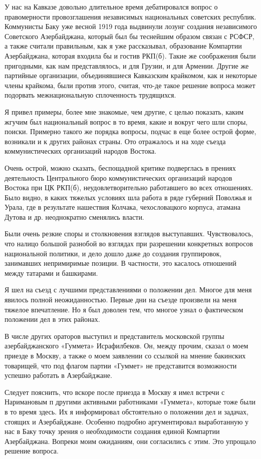 \documentclass[12pt, a4paper, openany]{book}
\begin{document}
У нас на Кавказе довольно длительное время дебатировался вопрос о правомерности провозглашения независимых национальных советских республик. Коммунисты Баку уже весной 1919 года выдвинули лозунг создания независимого Советского Азербайджана, который был бы теснейшим образом связан с РСФСР, а также считали правильным, как я уже рассказывал, образование Компартии Азербайджана, которая входила бы и гостив РКП(б). Такие же соображения были пригодными, как нам представлялось, и для Грузии, и для Армении. Другие же партийные организации, объединявшиеся Кавказским крайкомом, как и некоторые члены крайкома, были против этого, считая, что-де такое решение вопроса может подорвать межнациональную сплоченность трудящихся.

Я привел примеры, более мне знакомые, чем другие, с целью показать, каким жгучим был национальный вопрос в то время, какие и вокруг чего шли споры, поиски. Примерно такого же порядка вопросы, подчас в еще более острой форме, возникали и к других районах страны. Ото отражалось и на ходе съезда коммунистических организаций народов Востока.

Очень острой, можно сказать, беспощадной критике подверглась в прениях деятельность Центрального бюро коммунистических организаций народов Востока при ЦК РКП(б), неудовлетворительно работавшего во всех отношениях. Было видно, в каких тяжелых условиях шла работа в ряде губерний Поволжья и Урала, где в результате нашествия Колчака, чехословацкого корпуса, атамана Дутова и др. неоднократно сменялись власти.

Были очень резкие споры и столкновения взглядов выступавших. Чувствовалось, что налицо большой разнобой во взглядах при разрешении конкретных вопросов национальной политики, и дело дошло даже до создания группировок, занимавших непримиримые позиции. В частности, это касалось отношений между татарами и башкирами.

Я шел на съезд с лучшими представлениями о положении дел. Многое для меня явилось полной неожиданностью. Первые дни на съезде произвели на меня тяжелое впечатление. Но я был доволен тем, что многое узнал о фактическом положении дел в этих районах.

В числе других ораторов выступил и представитель московской группы азербайджанского «Гуммета» Исрафилбеков. Он, между прочим, сказал о моем приезде в Москву, а также о моем заявлении со ссылкой на мнение бакинских товарищей, что под флагом партии «Гуммет» не представится возможности успешно работать в Азербайджане.

Следует пояснить, что вскоре после приезда в Москву я имел встречи с Наримановым п другими активными работниками «Гуммета», которые тоже были в то время здесь. Их я информировал обстоятельно о положении дел и задачах, стоящих и Азербайджане. Особенно подробно аргументировал выработанную у нас в Баку точку зрения о необходимости создания единой Компартии Азербайджана. Вопреки моим ожиданиям, они согласились с этим. Это упрощало решение вопроса.
\end{document}
